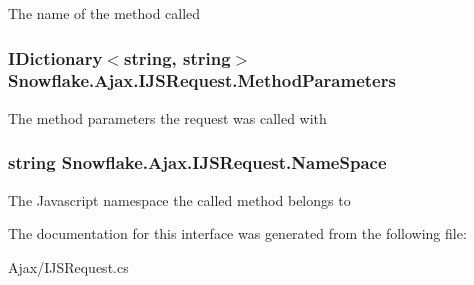The name of the method called 

\hypertarget{interface_snowflake_1_1_ajax_1_1_i_j_s_request_a29b4147b39836395032254affd4fba95}{}
\subsubsection[{Method\+Parameters}]{\setlength{\rightskip}{0pt plus 5cm}I\+Dictionary$<$string, string$>$ Snowflake.\+Ajax.\+I\+J\+S\+Request.\+Method\+Parameters\hspace{0.3cm}{\ttfamily [get]}}\label{interface_snowflake_1_1_ajax_1_1_i_j_s_request_a29b4147b39836395032254affd4fba95}


The method parameters the request was called with 

\hypertarget{interface_snowflake_1_1_ajax_1_1_i_j_s_request_a0a45d83b00bed741f7c37220ac298bb8}{}
\subsubsection[{Name\+Space}]{\setlength{\rightskip}{0pt plus 5cm}string Snowflake.\+Ajax.\+I\+J\+S\+Request.\+Name\+Space\hspace{0.3cm}{\ttfamily [get]}}\label{interface_snowflake_1_1_ajax_1_1_i_j_s_request_a0a45d83b00bed741f7c37220ac298bb8}


The Javascript namespace the called method belongs to 



The documentation for this interface was generated from the following file\+:\begin{DoxyCompactItemize}
\item 
Ajax/I\+J\+S\+Request.\+cs\end{DoxyCompactItemize}
